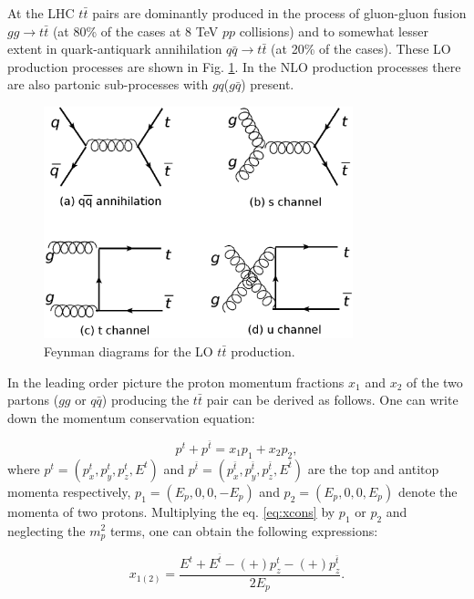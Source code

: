 At the LHC $t\bar{t}$ pairs are dominantly produced in the process of gluon-gluon fusion $gg \rightarrow t\bar{t}$ (at 80\% of the cases at 8 TeV $pp$ collisions) 
and to somewhat lesser extent in quark-antiquark annihilation $q\bar{q} \rightarrow t\bar{t}$ (at 20\% of the cases). These LO production processes are shown in 
Fig. \ref{fig:LO_tt_prod}. In the NLO production processes there are also partonic sub-processes with $gq$($g\bar{q}$) present.

\begin{figure}[h]
  \centering
  \includegraphics[width=0.8\textwidth]{01_Theory_SM/plots/LO_tt_production_uniform.png}
  \caption{Feynman diagrams for the LO $t\bar{t}$ production.}
  \label{fig:LO_tt_prod}
\end{figure}

In the leading order picture the proton momentum fractions $x_{1}$ and $x_{2}$ of the two partons ($gg$ or $q\bar{q}$) producing the $t\bar{t}$ pair can be derived
as follows. One can write down the momentum conservation equation:

\begin{equation}\label{eq:xcons}
 p^{t} + p^{\bar{t}} = x_{1}p_{1} + x_{2}p_{2}, 
\end{equation}
where $p^{t} = (p_{x}^{t}, p_{y}^{t}, p_{z}^{t}, E^{t})$ and $p^{\bar{t}} = (p_{x}^{\bar{t}}, p_{y}^{\bar{t}}, p_{z}^{\bar{t}}, E^{\bar{t}})$ are the top and antitop 
momenta respectively, $p_{1} = (E_{p},0,0, -E_{p})$ and $p_{2}= (E_{p},0,0, E_{p})$ denote the momenta of two protons. Multiplying the eq. \ref{eq:xcons} 
by $p_{1}$ or $p_{2}$ and neglecting the $m_{p}^{2}$ terms, one can obtain the following expressions:

\begin{equation}\label{eq:x12}
 x_{1(2)} = \frac{E^{t} + E^{\bar{t}} -(+) p_{z}^{t} -(+)p_{z}^{\bar{t}}}{2E_{p}}.
\end{equation}


